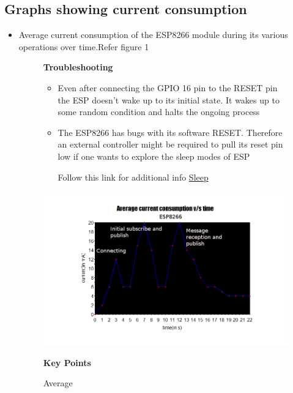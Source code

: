 \documentclass[16pt]{article}
\begin{document}
\vspace{0.5cm}
\subsection{Graphs showing current
consumption}

\begin{itemize}

\item
  Average current consumption of the ESP8266 module during its various
  operations over time.Refer figure 1 


\begin{figure}

\textbf{Troubleshooting}

\vspace{0.2cm}
\begin{itemize}
\item
  Even after connecting the GPIO 16 pin to the RESET pin the ESP doesn't
  wake up to its initial state. It wakes up to some random condition and
  halts the ongoing process
\item
  The ESP8266 has bugs with its software RESET. Therefore an external
  controller might be required to pull its reset pin low if one wants to
  explore the sleep modes of ESP
  
  Follow this link for additional info
\href{http://tinker.yeoman.com.au/2015/03/08/reducing-esp8266-power-consumption-using-deep-sleep/}{Sleep}
\end{itemize}
\includegraphics[width=1.2\textwidth]{images/average_current1.png}
\caption{Average}
\textbf{Key Points}

  \begin{itemize}


\end{itemize}
\end{figure}
\end{itemize}
\end{document}
